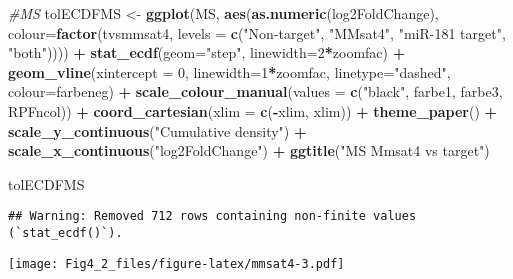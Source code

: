 \documentclass[
]{article}
\newenvironment{Shaded}{\begin{snugshade}}{\end{snugshade}}
\newcommand{\AttributeTok}[1]{\textcolor[rgb]{0.13,0.29,0.53}{#1}}
\newcommand{\CommentTok}[1]{\textcolor[rgb]{0.56,0.35,0.01}{\textit{#1}}}
\newcommand{\DecValTok}[1]{\textcolor[rgb]{0.00,0.00,0.81}{#1}}
\newcommand{\FunctionTok}[1]{\textcolor[rgb]{0.13,0.29,0.53}{\textbf{#1}}}
\newcommand{\NormalTok}[1]{#1}
\newcommand{\OtherTok}[1]{\textcolor[rgb]{0.56,0.35,0.01}{#1}}
\newcommand{\SpecialCharTok}[1]{\textcolor[rgb]{0.81,0.36,0.00}{\textbf{#1}}}
\newcommand{\StringTok}[1]{\textcolor[rgb]{0.31,0.60,0.02}{#1}}
\begin{document}
\begin{Shaded}
\begin{Highlighting}[]
\CommentTok{\#MS}
\NormalTok{tolECDFMS }\OtherTok{\textless{}{-}} \FunctionTok{ggplot}\NormalTok{(MS, }\FunctionTok{aes}\NormalTok{(}\FunctionTok{as.numeric}\NormalTok{(log2FoldChange), }\AttributeTok{colour=}\FunctionTok{factor}\NormalTok{(tvsmmsat4, }\AttributeTok{levels =} \FunctionTok{c}\NormalTok{(}\StringTok{"Non{-}target"}\NormalTok{, }\StringTok{"MMsat4"}\NormalTok{, }\StringTok{"miR{-}181 target"}\NormalTok{, }\StringTok{"both"}\NormalTok{)))) }\SpecialCharTok{+} 
  \FunctionTok{stat\_ecdf}\NormalTok{(}\AttributeTok{geom=}\StringTok{"step"}\NormalTok{, }\AttributeTok{linewidth=}\DecValTok{2}\SpecialCharTok{*}\NormalTok{zoomfac) }\SpecialCharTok{+}
  \FunctionTok{geom\_vline}\NormalTok{(}\AttributeTok{xintercept =} \DecValTok{0}\NormalTok{, }\AttributeTok{linewidth=}\DecValTok{1}\SpecialCharTok{*}\NormalTok{zoomfac, }\AttributeTok{linetype=}\StringTok{"dashed"}\NormalTok{, }\AttributeTok{colour=}\NormalTok{farbeneg) }\SpecialCharTok{+}
  \FunctionTok{scale\_colour\_manual}\NormalTok{(}\AttributeTok{values =} \FunctionTok{c}\NormalTok{(}\StringTok{"black"}\NormalTok{, farbe1, farbe3, RPFncol)) }\SpecialCharTok{+}
  \FunctionTok{coord\_cartesian}\NormalTok{(}\AttributeTok{xlim =} \FunctionTok{c}\NormalTok{(}\SpecialCharTok{{-}}\NormalTok{xlim, xlim)) }\SpecialCharTok{+} 
  \FunctionTok{theme\_paper}\NormalTok{() }\SpecialCharTok{+}
  \FunctionTok{scale\_y\_continuous}\NormalTok{(}\StringTok{"Cumulative density"}\NormalTok{) }\SpecialCharTok{+} \FunctionTok{scale\_x\_continuous}\NormalTok{(}\StringTok{"log2FoldChange"}\NormalTok{) }\SpecialCharTok{+}
  \FunctionTok{ggtitle}\NormalTok{(}\StringTok{"MS Mmsat4 vs target"}\NormalTok{)}

\NormalTok{tolECDFMS}
\end{Highlighting}
\end{Shaded}

\begin{verbatim}
## Warning: Removed 712 rows containing non-finite values (`stat_ecdf()`).
\end{verbatim}

\texttt{[image: Fig4\_2\_files/figure-latex/mmsat4-3.pdf]}
\end{document}
